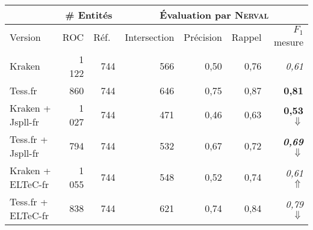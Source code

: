 \scriptsize{
\begin{tabular}{|l|r|r|r|r|r|r|}
\hline
 & \multicolumn{2}{c|}{{\# Entités}} & \multicolumn{4}{c|}{\'Evaluation par \textsc{Nerval}}\\
 \hline
Version & ROC & Réf.\ &Intersection& Précision & Rappel & $F_1$ mesure\\

 \hline
Kraken  & 1 122 & 744 &  566  & 0,50    &0,76  &\textit{0,61}  \\
\hline
Tess.fr  & 860 &744  &646     & 0,75     & 0,87  & \textbf{0,81}  \\
\hline
\hline
Kraken + Jspll-fr & 1 027  &744  &471     & 0,46     & 0,63  &\textbf{0,53} $\Downarrow$  \\
\hline
Tess.fr + Jspll-fr & 794&  744& 532     & 0,67 & 0,72 & \textit{\textbf{0,69}} $\Downarrow$  \\
\hline
\hline
Kraken + ELTeC-fr &1 055 & 744 &548 & 0,52     &0,74  & \textit{0,61} $\Uparrow$ \\
\hline
Tess.fr + ELTeC-fr &838 & 744 & 621  & 0,74     &0,84  & \textit{0,79} $\Downarrow$ \\
\hline
\end{tabular}}